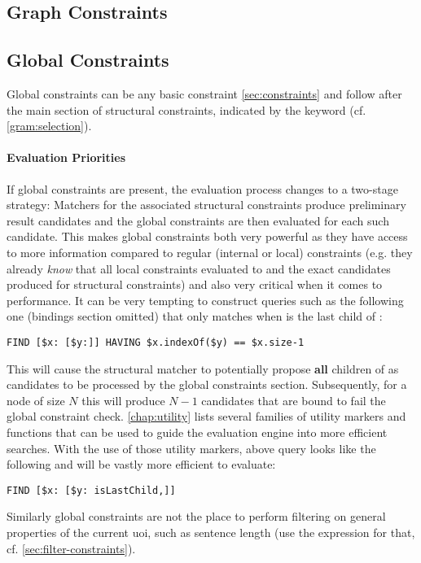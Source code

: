 \documentclass[11pt,a4paper]{report}
\begin{document}
\subsection{Graph Constraints}
\label{sec:graph-constraints}


\subsection{Global Constraints}
\label{sec:global-constraints}

Global constraints can be any basic constraint \cref{sec:constraints} and follow after the main section of structural constraints, indicated by the  keyword (cf. \cref{gram:selection}).

\paragraph{Evaluation Priorities}
\noindent If global constraints are present, the evaluation process changes to a two-stage strategy:
Matchers for the associated structural constraints produce preliminary result candidates and the global constraints are then evaluated for each such candidate.
This makes global constraints both very powerful as they have access to more information compared to regular (internal or local) constraints (e.g. they already \textit{know} that all local constraints evaluated to  and the exact candidates produced for structural constraints) and also very critical when it comes to performance.
It can be very tempting to construct queries such as the following one (bindings section omitted) that only matches when  is the last child of :
\begin{Verbatim}[samepage=true]
FIND [$x: [$y:]] HAVING $x.indexOf($y) == $x.size-1
\end{Verbatim}
This will cause the structural matcher to potentially propose \textbf{all} children of  as candidates to be processed by the global constraints section.
Subsequently, for a node of size $N$ this will produce $N-1$ candidates that are bound to fail the global constraint check.
\cref{chap:utility} lists several families of utility markers and functions that can be used to guide the evaluation engine into more efficient searches.
With the use of those utility markers, above query looks like the following and will be vastly more efficient to evaluate:
\begin{Verbatim}[samepage=true]
FIND [$x: [$y: isLastChild,]]
\end{Verbatim}
Similarly global constraints are not the place to perform filtering on general properties of the current \ac{uoi}, such as sentence length (use the  expression for that, cf. \cref{sec:filter-constraints}).
\end{document}
